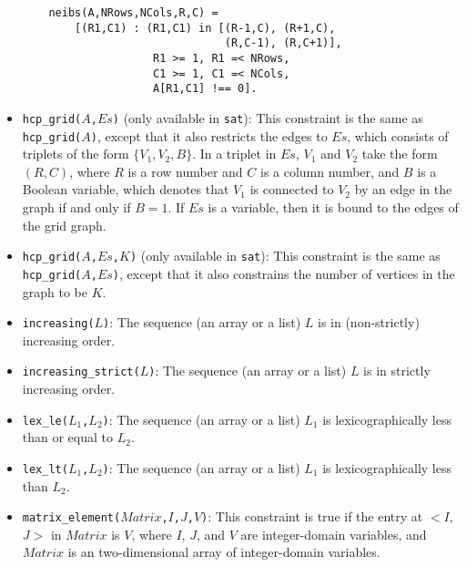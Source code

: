 \begin{itemize}
\begin{verbatim}
    neibs(A,NRows,NCols,R,C) = 
        [(R1,C1) : (R1,C1) in [(R-1,C), (R+1,C), 
                               (R,C-1), (R,C+1)],
                    R1 >= 1, R1 =< NRows,
                    C1 >= 1, C1 =< NCols, 
                    A[R1,C1] !== 0].
\end{verbatim}

\item \texttt{hcp\_grid($A$,$Es$)} (only available in \texttt{sat}): This constraint is the same as \texttt{hcp\_grid($A$)}, except that it also restricts the edges to $Es$, which consists of triplets of the form $\{V_1,V_2,B\}$. In a triplet in $Es$, $V_1$ and $V_2$ take the form $(R,C)$, where $R$ is a row number and $C$ is a column number, and $B$ is a Boolean variable, which denotes that $V_1$ is connected to $V_2$  by an edge in the graph if and only if $B = 1$. If $Es$ is a variable, then it is bound to the edges of the grid graph.  

\item \texttt{hcp\_grid($A$,$Es$,$K$)} (only available in \texttt{sat}): This constraint is the same as\\ \texttt{hcp\_grid($A$,$Es$)}, except that it also constrains the number of vertices in the graph to be $K$. 

\item \texttt{increasing($L$)}: The sequence (an array or a list) $L$ is in (non-strictly) increasing order.

\item \texttt{increasing\_strict($L$)}: The sequence (an array or a list) $L$ is in strictly increasing order.

\item \texttt{lex\_le($L_1$,$L_2$)}: The sequence (an array or a list) $L_1$ is lexicographically less than or equal to $L_2$.

\item \texttt{lex\_lt($L_1$,$L_2$)}: The sequence (an array or a list) $L_1$ is lexicographically less than $L_2$.

\item \texttt{matrix\_element($Matrix$,$I$,$J$,$V$)}: This constraint is true if the entry at $<$$I$,$J$$>$ in $Matrix$ is $V$, where $I$, $J$, and $V$ are integer-domain variables, and $Matrix$ is an two-dimensional array of integer-domain variables.


\end{itemize}
